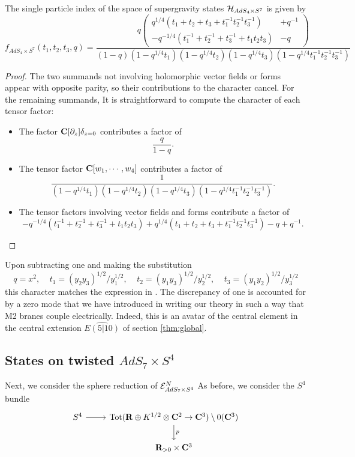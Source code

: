 \documentclass[../main.tex]{subfiles}
\begin{document}
\begin{prop}
The single particle index of the space of supergravity states $\mathcal{H}_{AdS_4\times S^7}$ is given by 
\[
f_{AdS_4\times S^7} (t_1, t_2, t_3, q)  = \frac{q\left (\begin{aligned} q^{1/4}(t_1+ t_2 + t_3+t_1^{-1}t_2^{-1}t_3^{-1}) &+ q^{-1} \\- q^{-1/4}(t_1^{-1}+ t_2^{-1} + t_3^{-1}+t_1t_2t_3) &- q   \end{aligned}\right)}{(1-q)(1-q^{1/4}t_1)(1-q^{1/4}t_2)(1-q^{1/4}t_3)(1-q^{1/4}t_1^{-1}t_2^{-1}t_3^{-1})}
\]
\end{prop}
\begin{proof}
The two summands not involving holomorphic vector fields or forms appear with opposite parity, so their contributions to the character cancel. For the remaining summands, It is straightforward to compute the character of each tensor factor:
\begin{itemize}
\item The factor $\mathbf{C}[\partial_z]\delta_{z=0}$ contributes a factor of \[\frac{q}{1-q}.\]
\item The tensor factor $\mathbf{C}[w_1,\cdots, w_4]$ contributes a factor of \[\frac{1}{(1-q^{1/4}t_1)(1-q^{1/4}t_2)(1-q^{1/4}t_3)(1-q^{1/4}t_1^{-1}t_2^{-1}t_3^{-1})}.\]
\item The tensor factors involving vector fields and forms contribute a factor of \[-q^{-1/4}(t_1^{-1}+ t_2^{-1} + t_3^{-1}+t_1t_2t_3) + q^{1/4}(t_1+ t_2 + t_3+t_1^{-1}t_2^{-1}t_3^{-1}) - q + q^{-1}.\]
\end{itemize}
\end{proof}

\parsec[] Upon subtracting one and making the substitution
\[
q = x^2, \ \ \ \ \ t_1 = (y_2y_3)^{1/2}/y_1^{1/2}, \ \ \ \ \ t_2 = (y_1y_3)^{1/2}/y_2^{1/2}, \ \ \ \ \ t_3 = (y_1y_2)^{1/2}/y_3^{1/2}
\]
this character matches the expression in \cite[Eq. 2.17]{Bhattacharya:2008zy}. The discrepancy of one is accounted for by a zero mode that we have introduced in writing our theory in such a way that M2 branes couple electrically. Indeed, this is an avatar of the central element in the central extension $\widehat{E(5|10)}$ of section \ref{thm:global}.

\subsection{States on twisted $AdS_7\times S^{4}$}
\label{s:ads7states}
Next, we consider the sphere reduction of $\mathcal{E}^N_{AdS_7\times S^4}$ As before, we consider the $S^4$ bundle 
\[
\begin{tikzcd}
S^4 \ar[r] & \operatorname{Tot} (\R\oplus K^{1/2}\otimes \C^2\to \C^3) \setminus 0(\C^3) \ar[d, "p"] \\ & \R_{>0}\times \C^3
\end{tikzcd}
\]
\end{document}
